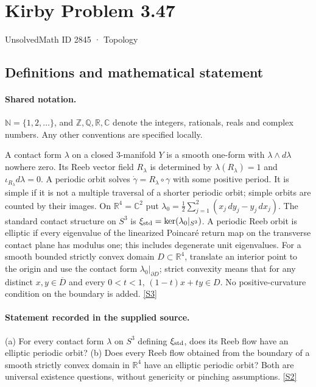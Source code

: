 \documentclass[11pt]{article}
\newcommand{\sref}[2]{\hyperlink{source:#1:#2}{[S#2]}}
\begin{document}
\setcounter{section}{2844}
\section{Kirby Problem 3.47}\label{2845}
{\small\sffamily UnsolvedMath ID 2845 · Topology}
\subsection{Definitions and mathematical statement}

\paragraph{Shared notation.}$\mathbb N=\{1,2,\ldots\}$, and $\mathbb Z,\mathbb Q,\mathbb R,\mathbb C$ denote the integers, rationals, reals and complex numbers. Any other conventions are specified locally.


A contact form $\lambda$ on a closed $3$-manifold $Y$ is a smooth one-form with $\lambda\wedge d\lambda$ nowhere zero. Its Reeb vector field $R_\lambda$ is determined by $\lambda(R_\lambda)=1$ and $\iota_{R_\lambda}d\lambda=0$. A periodic orbit solves $\dot\gamma=R_\lambda\circ\gamma$ with some positive period. It is simple if it is not a multiple traversal of a shorter periodic orbit; simple orbits are counted by their images. On $\mathbb R^4=\mathbb C^2$ put $\lambda_0=\tfrac12\sum_{j=1}^2(x_j\,dy_j-y_j\,dx_j)$. The standard contact structure on $S^3$ is $\xi_{\rm std}=\ker(\lambda_0|_{S^3})$. A periodic Reeb orbit is elliptic if every eigenvalue of the linearized Poincar\'e return map on the transverse contact plane has modulus one; this includes degenerate unit eigenvalues. For a smooth bounded strictly convex domain $D\subset\mathbb R^4$, translate an interior point to the origin and use the contact form $\lambda_0|_{\partial D}$; strict convexity means that for any distinct $x,y\in\overline D$ and every $0<t<1$, $(1-t)x+ty\in D$. No positive-curvature condition on the boundary is added. \sref{2845}{3}
\paragraph{Statement recorded in the supplied source.}
(a) For every contact form $\lambda$ on $S^3$ defining $\xi_{\rm std}$, does its Reeb flow have an elliptic periodic orbit? (b) Does every Reeb flow obtained from the boundary of a smooth strictly convex domain in $\mathbb R^4$ have an elliptic periodic orbit? Both are universal existence questions, without genericity or pinching assumptions. \sref{2845}{2}
\end{document}
